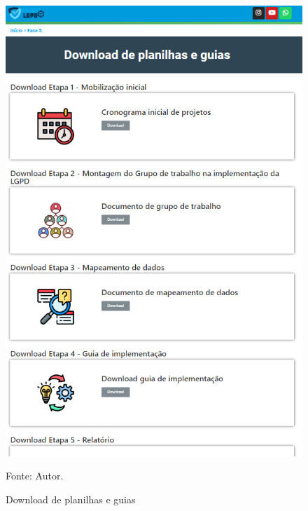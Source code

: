 \documentclass[
	12pt,				%
	openright,			%
	oneside,			%
	a4paper,			%
	english,			%
	french,				%
	spanish,			%
	brazil,				%
	]{abntex2}
\begin{document}
\begin{figure}[ht]
    \centering
    \caption{Download de planilhas e guias}
    \includegraphics[width=5.0in]{Images/download de planilha.png}
    \label{fig: download}
    
    \centering \small Fonte: Autor.
\end{figure}
\end{document}
